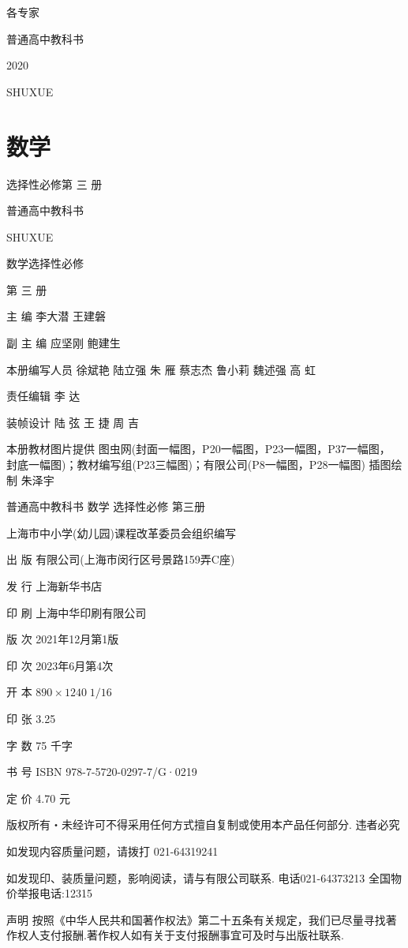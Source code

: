 \documentclass[10pt]{article}
\begin{document}
各专家

普通高中教科书

2020

SHUXUE

\section*{数学}

选择性必修第 三 册



普通高中教科书

SHUXUE

数学选择性必修

第 三 册





主 编 李大潜 王建磐

副 主 编 应坚刚 鲍建生

本册编写人员 徐斌艳 陆立强 朱 雁 蔡志杰 鲁小莉 魏述强 高 虹

责任编辑 李 达

装帧设计 陆 弦 王 捷 周 吉

本册教材图片提供 图虫网(封面一幅图，P20一幅图，P23一幅图，P37一幅图， 封底一幅图)；教材编写组(P23三幅图)；有限公司(P8一幅图，P28一幅图) 插图绘制 朱泽宇

普通高中教科书 数学 选择性必修 第三册

上海市中小学(幼儿园)课程改革委员会组织编写

出 版 有限公司(上海市闵行区号景路159弄C座)

发 行 上海新华书店

印 刷 上海中华印刷有限公司

版 次 2021年12月第1版

印 次 2023年6月第4次

开 本 \({890} \times  {1240}\;1/{16}\)

印 张 3.25

字 数 75 千字

书 号 ISBN 978-7-5720-0297-7/G·0219

定 价 4.70 元

版权所有・未经许可不得采用任何方式擅自复制或使用本产品任何部分. 违者必究

如发现内容质量问题，请拨打 021-64319241

如发现印、装质量问题，影响阅读，请与有限公司联系. 电话021-64373213 全国物价举报电话:12315

声明 按照《中华人民共和国著作权法》第二十五条有关规定，我们已尽量寻找著作权人支付报酬.著作权人如有关于支付报酬事宜可及时与出版社联系.
\end{document}

